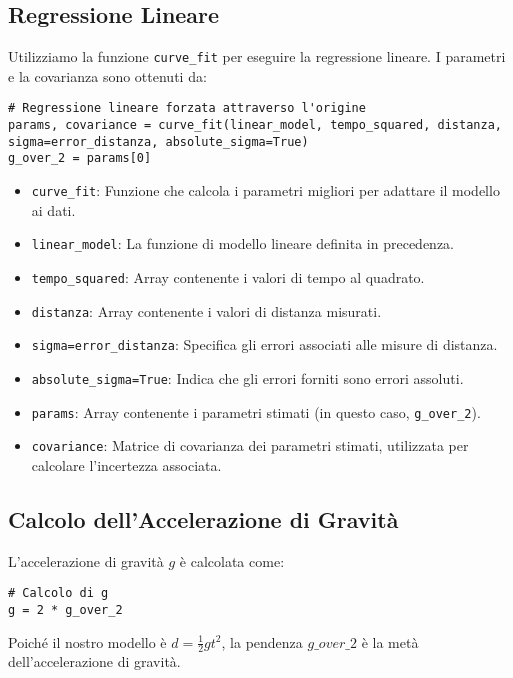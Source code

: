 \subsection{Regressione Lineare}
Utilizziamo la funzione \texttt{curve\_fit} per eseguire la regressione lineare. I parametri e la covarianza sono ottenuti da:

\begin{lstlisting}
# Regressione lineare forzata attraverso l'origine
params, covariance = curve_fit(linear_model, tempo_squared, distanza, sigma=error_distanza, absolute_sigma=True)
g_over_2 = params[0]
\end{lstlisting}

\begin{itemize}
    \item \texttt{curve\_fit}: Funzione che calcola i parametri migliori per adattare il modello ai dati.
    \item \texttt{linear\_model}: La funzione di modello lineare definita in precedenza.
    \item \texttt{tempo\_squared}: Array contenente i valori di tempo al quadrato.
    \item \texttt{distanza}: Array contenente i valori di distanza misurati.
    \item \texttt{sigma=error\_distanza}: Specifica gli errori associati alle misure di distanza.
    \item \texttt{absolute\_sigma=True}: Indica che gli errori forniti sono errori assoluti.
    \item \texttt{params}: Array contenente i parametri stimati (in questo caso, \texttt{g\_over\_2}).
    \item \texttt{covariance}: Matrice di covarianza dei parametri stimati, utilizzata per calcolare l'incertezza associata.
\end{itemize}

\subsection{Calcolo dell'Accelerazione di Gravità}
L'accelerazione di gravità \( g \) è calcolata come:

\begin{lstlisting}
# Calcolo di g
g = 2 * g_over_2
\end{lstlisting}

Poiché il nostro modello è \( d = \frac{1}{2} g t^2 \), la pendenza \( g\_over\_2 \) è la metà dell'accelerazione di gravità.

